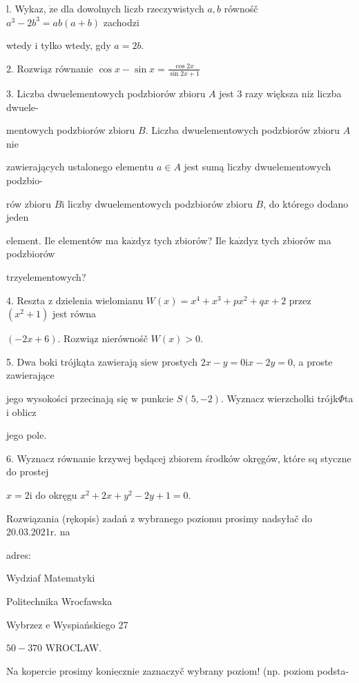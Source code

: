 \documentclass[a4paper,12pt]{article}
\begin{document}
l. Wykaz, $\dot{\mathrm{z}}\mathrm{e}$ dla dowolnych liczb rzeczywistych $a, b$ równośč $a^{3}-2b^{3}=ab(a+b)$ zachodzi

wtedy $\mathrm{i}$ tylko wtedy, gdy $a=2b.$

2. Rozwiąz równanie $\displaystyle \cos x-\sin x=\frac{\cos 2x}{\sin 2x+1}$

3. Liczba dwuelementowych podzbiorów zbioru $A$ jest 3 razy większa $\mathrm{n}\mathrm{i}\dot{\mathrm{z}}$ liczba dwuele-

mentowych podzbiorów zbioru $B$. Liczba dwuelementowych podzbiorów zbioru $A$ nie

zawierających ustalonego elementu $a\in A$ jest sumą liczby dwuelementowych podzbio-

rów zbioru $B\mathrm{i}$ liczby dwuelementowych podzbiorów zbioru $B$, do którego dodano jeden

element. Ile elementów ma $\mathrm{k}\mathrm{a}\dot{\mathrm{z}}\mathrm{d}\mathrm{y}\mathrm{z}$ tych zbiorów? Ile $\mathrm{k}\mathrm{a}\dot{\mathrm{z}}\mathrm{d}\mathrm{y}\mathrm{z}$ tych zbiorów ma podzbiorów

trzyelementowych?

4. Reszta $\mathrm{z}$ dzielenia wielomianu $W(x)=x^{4}+x^{3}+px^{2}+qx+2$ przez $(x^{2}+1)$ jest równa

$(-2x+6)$. Rozwiąz nierównośč $W(x)>0.$

5. Dwa boki trójkąta zawierają $\mathrm{s}\mathrm{i}\mathrm{e}\mathrm{w}$ prostych $2x-y=0\mathrm{i}x-2y=0$, a proste zawierające

jego wysokości przecinają się $\mathrm{w}$ punkcie $S(5,-2)$. Wyznacz wierzcholki trójk$\Phi$ta $\mathrm{i}$ oblicz

jego pole.

6. Wyznacz równanie krzywej będącej zbiorem środków okręgów, które sq styczne do prostej

$x=2\mathrm{i}$ do okręgu $x^{2}+2x+y^{2}-2y+1=0.$

Rozwiązania (rękopis) zadań z wybranego poziomu prosimy nadsyłač do 20.03.2021r. na

adres:

Wydziaf Matematyki

Politechnika Wrocfawska

Wybrzez $\mathrm{e}$ Wyspiańskiego 27

$50-370$ WROCLAW.

Na kopercie prosimy $\underline{\mathrm{k}\mathrm{o}\mathrm{n}\mathrm{i}\mathrm{e}\mathrm{c}\mathrm{z}\mathrm{n}\mathrm{i}\mathrm{e}}$ zaznaczyč wybrany poziom! (np. poziom podsta-
\end{document}
